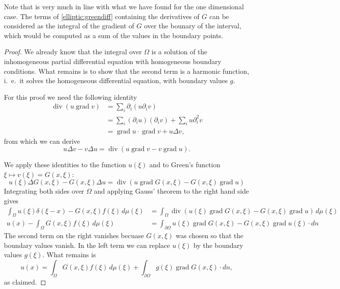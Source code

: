 Note that is very much in line with what we have found for the one
dimensional case.
The terms of \eqref{elliptic:greendiff} containing the derivatives
of $G$ can be considered as the integral of the gradient of $G$
over the bounary of the interval, which would be computed as a sum
of the values in the boundary points.

\begin{proof}
We already know that the integral over $\Omega$ is a solution of the
inhomogeneous partial differential equation with homogeneous boundary
conditions.
What remains is to show that the second term is a harmonic function,
i.~e.~it solves the homogeneous differential equation,
with boundary values $g$.

For this proof we need the following identity
\begin{align*}
\operatorname{div}(u\operatorname{grad}v)
&=
\sum_i\partial_i(u\partial_iv)
\\
&=\sum_i(\partial_iu)(\partial_iv)+\sum_iu\partial_i^2v
\\
&=\operatorname{grad}u\cdot\operatorname{grad}v+u\Delta v,
\end{align*}
from which we can derive
\[
u\Delta v-v\Delta u
=
\operatorname{div}(u\operatorname{grad}v-v\operatorname{grad}u).
\]

We apply these identities to the function $u(\xi)$ and 
to Green's function $\xi\mapsto v(\xi)=G(x,\xi)$:
\[
u(\xi)\Delta G(x,\xi)-G(x,\xi)\Delta u
=
\operatorname{div}(u\operatorname{grad}G(x,\xi)-G(x,\xi)\operatorname{grad}u)
\]
Integrating both sides over $\Omega$ and applying Gauss' theorem to
the right hand side gives
\begin{align*}
\int_{\Omega}u(\xi)\delta(\xi - x)-G(x,\xi)f(\xi)\,d\mu(\xi)
&=
\int_{\Omega}\operatorname{div}(u(\xi)\operatorname{grad}G(x,\xi)-G(x,\xi)\operatorname{grad}u)\,d\mu(\xi)
\\
u(x)-\int_{\Omega}G(x,\xi)f(\xi)\,d\mu(\xi)
&=\int_{\partial \Omega}u(\xi)\operatorname{grad}G(x,\xi)-G(x,\xi)\operatorname{grad}u(\xi)\cdot dn
\end{align*}
The second term on the right vanishes becuase $G(x,\xi)$ was chosen so
that the boundary values vanish.
In the left term we can replace $u(\xi)$ by the boundary values $g(\xi)$.
What remains is
\[
u(x)
=
\int_{\Omega}G(x,\xi)f(\xi)\,d\mu(\xi)
+
\int_{\partial\Omega}g(\xi)\operatorname{grad}G(x,\xi)\cdot dn,
\]
as claimed.
\end{proof}

